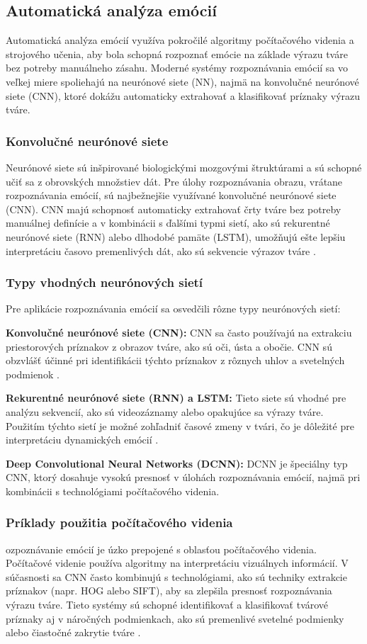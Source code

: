 \subsection{Automatická analýza emócií}
Automatická analýza emócií využíva pokročilé algoritmy počítačového videnia a strojového učenia, aby bola schopná rozpoznať emócie na základe výrazu tváre bez potreby manuálneho zásahu. 
Moderné systémy rozpoznávania emócií sa vo veľkej miere spoliehajú na neurónové siete (NN), najmä na konvolučné neurónové siete (CNN), ktoré dokážu automaticky extrahovať a klasifikovať príznaky výrazu tváre.

\subsubsection{Konvolučné neurónové siete}
Neurónové siete sú inšpirované biologickými mozgovými štruktúrami a sú schopné učiť sa z obrovských množstiev dát. Pre úlohy rozpoznávania obrazu, vrátane rozpoznávania emócií, 
sú najbežnejšie využívané konvolučné neurónové siete (CNN)​. CNN majú schopnosť automaticky extrahovať črty tváre bez potreby manuálnej definície a v kombinácii s ďalšími typmi sietí,
ako sú rekurentné neurónové siete (RNN) alebo dlhodobé pamäte (LSTM), umožňujú ešte lepšiu interpretáciu časovo premenlivých dát, ako sú sekvencie výrazov tváre \cite{article01} \cite{misc01}.

\subsubsection{Typy vhodných neurónových sietí}
Pre aplikácie rozpoznávania emócií sa osvedčili rôzne typy neurónových sietí:

\textbf{Konvolučné neurónové siete (CNN):} CNN sa často používajú na extrakciu priestorových príznakov z obrazov tváre, ako sú oči, ústa a obočie​. CNN sú obzvlášť účinné pri identifikácii týchto príznakov 
z rôznych uhlov a svetelných podmienok \cite{article05}.

\textbf{Rekurentné neurónové siete (RNN) a LSTM: }Tieto siete sú vhodné pre analýzu sekvencií, ako sú videozáznamy alebo opakujúce sa výrazy tváre. Použitím týchto sietí je možné zohľadniť časové zmeny v tvári,
 čo je dôležité pre interpretáciu dynamických emócií​ \cite{article02}.

\textbf{Deep Convolutional Neural Networks (DCNN): } DCNN je špeciálny typ CNN, ktorý dosahuje vysokú presnosť v úlohách rozpoznávania emócií, najmä pri kombinácii s technológiami počítačového videnia.
\subsubsection{Príklady použitia počítačového videnia}
ozpoznávanie emócií je úzko prepojené s oblasťou počítačového videnia. Počítačové videnie používa algoritmy na interpretáciu vizuálnych informácií. V súčasnosti sa CNN často kombinujú s technológiami, 
ako sú techniky extrakcie príznakov (napr. HOG alebo SIFT), aby sa zlepšila presnosť rozpoznávania výrazu tváre. Tieto systémy sú schopné identifikovať a klasifikovať tvárové príznaky aj v náročných podmienkach,
 ako sú premenlivé svetelné podmienky alebo čiastočné zakrytie tváre \cite{Huang2023}.


